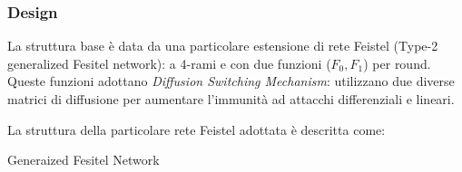 \documentclass[target=bach,aauheader=,style=]{thud}
\begin{document}
			\subsubsection{Design}
			La struttura base è data da una particolare estensione di rete Feistel (Type-2 generalized Fesitel network): a 4-rami e con due funzioni ($F_0, F_1$) per round. Queste funzioni adottano \textit{Diffusion Switching Mechanism}\cite{clefiadsm}: utilizzano due diverse matrici di diffusione per aumentare l'immunità ad attacchi differenziali e lineari.
			
			La struttura della particolare rete Feistel adottata è descritta come:\\
			\begin{algorithm}[htbp]
				\caption{Generaized Fesitel Network}
				\begin{algorithmic}
						\EndFor
					\EndProcedure
				\end{algorithmic}
			\end{algorithm}
			
\end{document}
